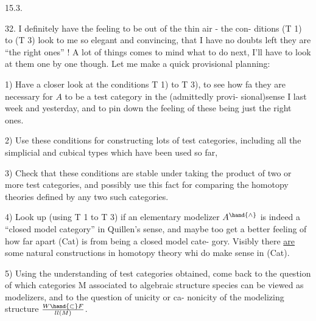 
15.3.

32.   I definitely have the feeling to be out of the thin air  -  the con-%
ditions  (T 1) to (T 3) look to me so elegant and convincing,  that I have
no doubts left they are ``the right ones'' !  A lot of things comes to mind
what to do next,  I'll have to look at them one by one though. Let me make
a quick provisional planning:

1)  Have a closer look at the conditions  T 1) to  T 3),  to see how fa
they are necessary for  $A$ to be a test category in the (admittedly provi-%
sional)sense\xout{\unsure{;}} I  last week and yesterday,  and to pin down
the feeling of these being just the right ones.

2)  Use these conditions for constructing lots of test categories,
including all the simplicial and cubical types which have been used so far,

3)  Check that these conditions are stable under taking the product of
two or more test categories,  and possibly use this fact for comparing
the homotopy theories defined by any two such categories.

4)  Look up  (using T 1 to T 3) if an elementary  modelizer $A^{\hand{\wedge}}$
is indeed a ``closed model category'' in Quillen's sense,  and maybe too get
a better feeling of how far apart (Cat) is from being a closed model cate-%
gory. Visibly there \uline{are} some natural constructions in homotopy theory whi
do make sense in (Cat).

5)  Using the understanding of test categories obtained,  come back to
the question of which categories M associated to  algebraic structure
species can be viewed as modelizers,  and to the question of unicity or ca-%
nonicity of the modelizing structure $W\hand{\subset}F\over{l}{l}(M)$.

